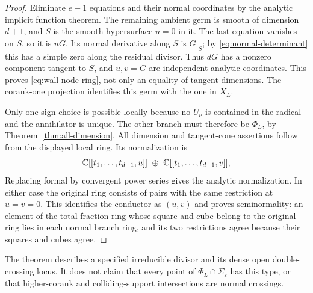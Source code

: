 \begin{proof}
Eliminate $e-1$ equations and their normal coordinates by the analytic
implicit function theorem. The remaining ambient germ is smooth of
dimension $d+1$, and $S$ is the smooth hypersurface $u=0$ in it.
The last equation vanishes on $S$, so it is $uG$. Its normal derivative
along $S$ is $G|_S$; by \eqref{eq:normal-determinant} this has a simple
zero along the residual divisor. Thus $dG$ has a nonzero component
tangent to $S$, and $u,v=G$ are independent analytic coordinates.
This proves \eqref{eq:wall-node-ring}, not only an equality of tangent
dimensions. The corank-one projection identifies this germ with the
one in $X_L$.

Only one sign choice is possible locally because no $U_\nu$ is
contained in the radical and the annihilator is unique. The other
branch must therefore be $\Phi_L$, by
Theorem~\ref{thm:all-dimension}. All dimension and tangent-cone
assertions follow from the displayed local ring. Its normalization is
\[
 \mathbb C[[t_1,\ldots,t_{d-1},u]]\ \oplus\
 \mathbb C[[t_1,\ldots,t_{d-1},v]],
\]
Replacing formal by convergent power series gives the analytic
normalization. In either case the original ring consists of pairs with
the same restriction at
$u=v=0$. This identifies the conductor as $(u,v)$ and proves
seminormality: an element of the total fraction ring whose square and
cube belong to the original ring lies in each normal branch ring, and
its two restrictions agree because their squares and cubes agree.
\end{proof}
The theorem describes a specified irreducible divisor and its dense
open double-crossing locus. It does not claim that every point of
$\Phi_L\cap\Sigma_\varepsilon$ has this type, or that higher-corank
and colliding-support intersections are normal crossings.


